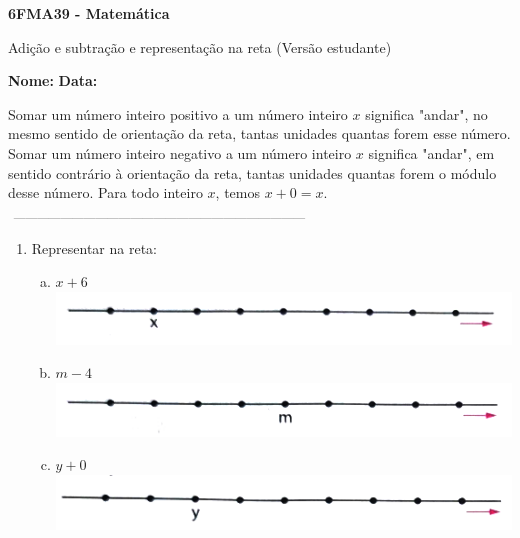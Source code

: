 \documentclass[a4paper,14pt]{article}
\begin{document}
	
	\noindent\textbf{6FMA39 - Matemática} 
	
	\begin{center}Adição e subtração e representação na reta (Versão estudante)
	\end{center}
	
	\noindent\textbf{Nome:} \underline{\hspace{10cm}}
	\noindent\textbf{Data:} \underline{\hspace{4cm}}
	
    \begin{multicols}{2}
    	\noindent Somar um número inteiro positivo a um número inteiro $x$ significa "andar", no mesmo sentido de orientação da reta, tantas unidades quantas forem esse número. \\
    	Somar um número inteiro negativo a um número inteiro $x$ significa "andar", em sentido contrário à orientação da reta, tantas unidades quantas forem o módulo desse número.
    	Para todo inteiro $x$, temos $x + 0 = x$.
    	\noindent\textsubscript{~---------------------------------------------------------------------------}
    	\begin{enumerate}
    		\item Representar na reta:
    		\begin{enumerate}[a)]
    			\item $x + 6$ \\
    			\noindent\includegraphics[width=1.1\linewidth]{imagens_6FMA39/imagem1}
    			\\
    			\item $m - 4$ \\
    			\noindent\includegraphics[width=1.1\linewidth]{imagens_6FMA39/imagem2}
    			\\
    			\item $y + 0$ \\
    			\noindent\includegraphics[width=1.1\linewidth]{imagens_6FMA39/imagem3}

\end{enumerate}
\end{enumerate}
\end{multicols}
\end{document}
